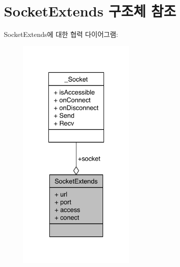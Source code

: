 \hypertarget{struct_socket_extends}{\section{Socket\-Extends 구조체 참조}
\label{struct_socket_extends}
}


Socket\-Extends에 대한 협력 다이어그램\-:\nopagebreak
\begin{figure}[H]
\begin{center}
\leavevmode
\includegraphics[width=164pt]{d0/d18/struct_socket_extends__coll__graph}
\end{center}
\end{figure}
